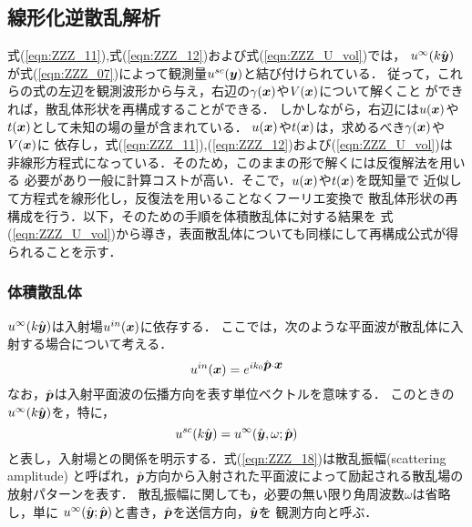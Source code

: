 \subsection{線形化逆散乱解析}
式(\ref{eqn:ZZZ_11}),式(\ref{eqn:ZZZ_12})および式(\ref{eqn:ZZZ_U_vol})では，
$u^{\infty}(k\hat{\mbox{\boldmath $y$}})$が式(\ref{eqn:ZZZ_07})によって観測量$u^{sc}(\mbox{\boldmath $y$})$と結び付けられている．
従って，これらの式の左辺を観測波形から与え，右辺の$\gamma(\mbox{\boldmath $x$})$や$V(\mbox{\boldmath $x$})$について解くこと
ができれば，散乱体形状を再構成することができる．
しかしながら，右辺には$u(\mbox{\boldmath $x$})$や$t(\mbox{\boldmath $x$})$として未知の場の量が含まれている．
$u(\mbox{\boldmath $x$})$や$t(\mbox{\boldmath $x$})$は，求めるべき$\gamma(\mbox{\boldmath $x$})$や$V(\mbox{\boldmath $x$})$に
依存し，式(\ref{eqn:ZZZ_11}),(\ref{eqn:ZZZ_12})および(\ref{eqn:ZZZ_U_vol})は
非線形方程式になっている．そのため，このままの形で解くには反復解法を用いる
必要があり一般に計算コストが高い．そこで，$u(\mbox{\boldmath $x$})$や$t(\mbox{\boldmath $x$})$を既知量で
近似して方程式を線形化し，反復法を用いることなくフーリエ変換で
散乱体形状の再構成を行う．以下，そのための手順を体積散乱体に対する結果を
式(\ref{eqn:ZZZ_U_vol})から導き，表面散乱体についても同様にして再構成公式が得られることを示す．
\subsubsection{体積散乱体}
$u^{\infty}(k\hat{\mbox{\boldmath $y$}})$は入射場$u^{in}(\mbox{\boldmath $x$})$に依存する．
ここでは，次のような平面波が散乱体に入射する場合について考える．
\begin{equation}
	u^{in}(\mbox{\boldmath $x$})= e^{ik_0\hat{\mbox{\boldmath $p$}}\cdot\mbox{\boldmath $x$}}
	\label{eqn:ZZZ_17}
\end{equation}
なお，$\hat{\mbox{\boldmath $p$}}$は入射平面波の伝播方向を表す単位ベクトルを意味する．
このときの$u^{\infty}(k\hat{\mbox{\boldmath $y$}})$を，特に，
\begin{equation}
	u^{sc}(k\hat{\mbox{\boldmath $y$}})
	=
	u^{\infty}(\hat{\mbox{\boldmath $y$}},\omega;\hat{\mbox{\boldmath $p$}})
	\label{eqn:ZZZ_18}
\end{equation}
と表し，入射場との関係を明示する．式(\ref{eqn:ZZZ_18})は散乱振幅(scattering amplitude)
と呼ばれ，$\hat{\mbox{\boldmath $p$}}$方向から入射された平面波によって励起される散乱場の放射パターンを表す．
散乱振幅に関しても，必要の無い限り角周波数$\omega$は省略し，単に
$u^{\infty}(\hat{\mbox{\boldmath $y$}};\hat{\mbox{\boldmath $p$}})$と書き，$\hat{\mbox{\boldmath $p$}}$を送信方向，$\hat{\mbox{\boldmath $y$}}$を
観測方向と呼ぶ．

